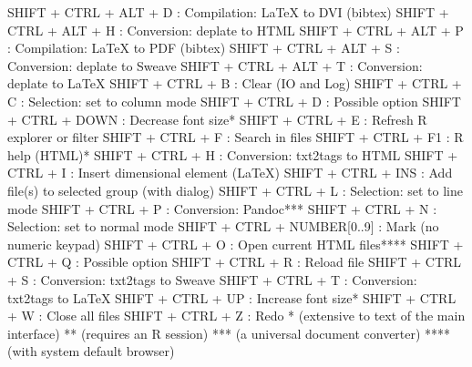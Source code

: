 \begin{Rtables}[caption={[SHIFT + keyboard shortcuts]
    SHIFT + keyboard shortcuts},
  label=shortcut:shiftplus]
  SHIFT + CTRL + ALT + D      : Compilation: LaTeX to DVI (bibtex)
  SHIFT + CTRL + ALT + H      : Conversion: deplate to HTML
  SHIFT + CTRL + ALT + P      : Compilation: LaTeX to PDF (bibtex)
  SHIFT + CTRL + ALT + S      : Conversion: deplate to Sweave
  SHIFT + CTRL + ALT + T      : Conversion: deplate to LaTeX
  SHIFT + CTRL + B            : Clear (IO and Log)
  SHIFT + CTRL + C            : Selection: set to column mode
  SHIFT + CTRL + D            : Possible option
  SHIFT + CTRL + DOWN         : Decrease font size*
  SHIFT + CTRL + E            : Refresh R explorer or filter
  SHIFT + CTRL + F            : Search in files
  SHIFT + CTRL + F1           : R help (HTML)*
  SHIFT + CTRL + H            : Conversion: txt2tags to HTML
  SHIFT + CTRL + I            : Insert dimensional element (LaTeX)
  SHIFT + CTRL + INS          : Add file(s) to selected group (with dialog)
  SHIFT + CTRL + L            : Selection: set to line mode
  SHIFT + CTRL + P            : Conversion: Pandoc***
  SHIFT + CTRL + N            : Selection: set to normal mode
  SHIFT + CTRL + NUMBER[0..9] : Mark (no numeric keypad)
  SHIFT + CTRL + O            : Open current HTML files****
  SHIFT + CTRL + Q            : Possible option
  SHIFT + CTRL + R            : Reload file
  SHIFT + CTRL + S            : Conversion: txt2tags to Sweave
  SHIFT + CTRL + T            : Conversion: txt2tags to LaTeX
  SHIFT + CTRL + UP           : Increase font size*
  SHIFT + CTRL + W            : Close all files
  SHIFT + CTRL + Z            : Redo
  *    (extensive to text of the main interface)
  **   (requires an R session)
  ***  (a universal document converter)
  **** (with system default browser)
\end{Rtables}
